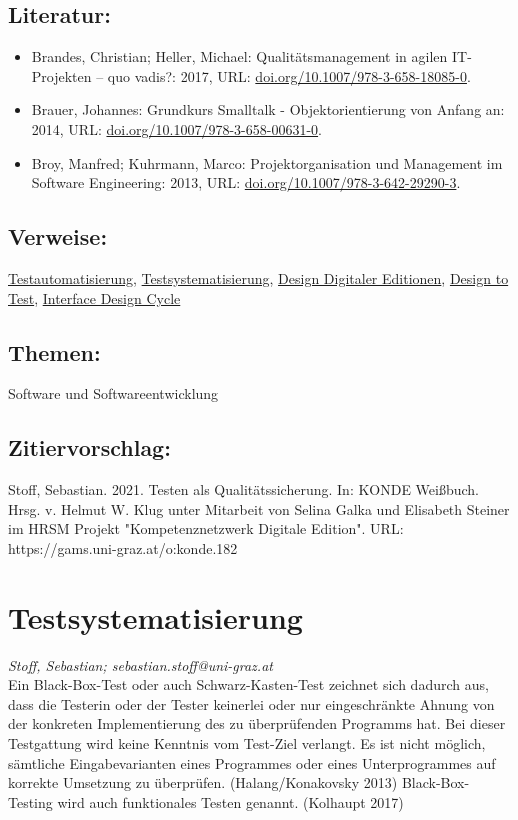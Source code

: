 \documentclass{article}
\begin{document}
        \subsection*{Literatur:}\begin{itemize}\item Brandes, Christian; Heller, Michael: Qualitätsmanagement in agilen IT-Projekten – quo vadis?: 2017, URL: \url{doi.org/10.1007/978-3-658-18085-0}.\item Brauer, Johannes: Grundkurs Smalltalk - Objektorientierung von Anfang an: 2014, URL: \url{doi.org/10.1007/978-3-658-00631-0}.\item Broy, Manfred; Kuhrmann, Marco: Projektorganisation und Management im Software Engineering: 2013, URL: \url{doi.org/10.1007/978-3-642-29290-3}.\end{itemize}\subsection*{Verweise:}\href{https://gams.uni-graz.at/o:konde.181}{Testautomatisierung}, \href{https://gams.uni-graz.at/o:konde.183}{Testsystematisierung}, \href{https://gams.uni-graz.at/o:konde.56}{Design Digitaler Editionen}, \href{https://gams.uni-graz.at/o:konde.57}{Design to Test}, \href{https://gams.uni-graz.at/o:konde.99}{Interface Design Cycle}\subsection*{Themen:}Software und Softwareentwicklung\subsection*{Zitiervorschlag:}Stoff, Sebastian. 2021. Testen als Qualitätssicherung. In: KONDE Weißbuch. Hrsg. v. Helmut W. Klug unter Mitarbeit von Selina Galka und Elisabeth Steiner im HRSM Projekt "Kompetenznetzwerk Digitale Edition". URL: https://gams.uni-graz.at/o:konde.182\newpage\section*{Testsystematisierung} \emph{Stoff, Sebastian; sebastian.stoff@uni-graz.at }\\
        
    Ein Black-Box-Test oder auch Schwarz-Kasten-Test zeichnet sich dadurch aus, dass die Testerin oder der Tester keinerlei oder nur eingeschränkte Ahnung von der konkreten Implementierung des zu überprüfenden Programms hat. Bei dieser Testgattung wird keine Kenntnis vom Test-Ziel verlangt. Es ist nicht möglich, sämtliche Eingabevarianten eines Programmes oder eines Unterprogrammes auf korrekte Umsetzung zu überprüfen. (Halang/Konakovsky 2013) Black-Box-Testing wird auch funktionales Testen genannt. (Kolhaupt 2017)\\
            
\end{document}
